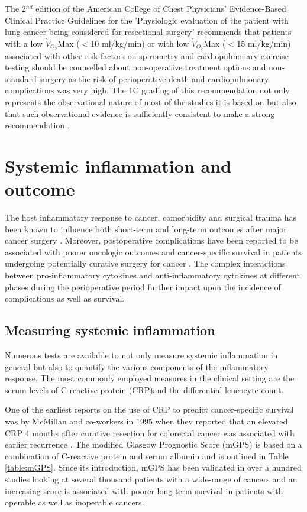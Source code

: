 The 2$^{nd}$ edition of the American College of Chest Physicians' Evidence-Based Clinical Practice Guidelines for the 'Physiologic evaluation of the patient with lung cancer being considered for resectional surgery' recommends that patients with a low $\dot{V}_{O_2}$Max ($<$10 ml/kg/min) or with low $\dot{V}_{O_2}$Max ($<$15 ml/kg/min) associated with other risk factors on spirometry and cardiopulmonary exercise testing should be counselled about non-operative treatment options and non-standard surgery as the risk of perioperative death and cardiopulmonary complications was very high. 
The 1C grading of this recommendation not only represents the observational nature of most of the studies it is based on but also that such observational evidence is sufficiently consistent \parencite{benzo_complications_2007} to make a strong recommendation \parencite{colice_physiologic_2007}. 

\clearpage

\section{Systemic inflammation and outcome}
\label{sec:intro_systemic_inflammation_outcome}

The host inflammatory response to cancer, comorbidity and surgical trauma has been known to influence both short-term and long-term outcomes after major cancer surgery \parencite{mcmillan_measurement_2001, read_differential_2004, roxburgh_relationship_2010}.
Moreover, postoperative complications have been reported to be associated with poorer oncologic outcomes and cancer-specific survival in patients undergoing potentially curative surgery for cancer \parencite{mcardle_impact_2005}. 
The complex interactions between pro-inflammatory cytokines and anti-inflammatory cytokines at different phases during the perioperative period further impact upon the incidence of complications as well as survival.

\subsection{Measuring systemic inflammation}
Numerous tests are available to not only measure systemic inflammation in general but also to quantify the various components of the inflammatory response. 
The most commonly employed measures in the clinical setting are the serum levels of C-reactive protein (CRP)and the differential leucocyte count. 

One of the earliest reports on the use of CRP to predict cancer-specific survival was by McMillan and co-workers in 1995 when they reported that an elevated CRP 4 months after curative resection for colorectal cancer was associated with earlier recurrence \parencite{mcmillan_prospective_1995}. 
The modified Glasgow Prognostic Score (mGPS) \parencite{elahi_score_2004} is based on a combination of C-reactive protein and serum albumin and is outlined in Table \ref{table:mGPS}.
Since its introduction, mGPS has been validated in over a hundred studies looking at several thousand patients with a wide-range of cancers and an increasing score is associated with poorer long-term survival in patients with operable as well as inoperable cancers.

